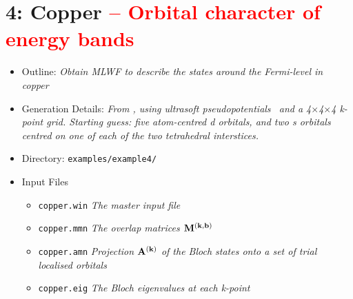 \documentclass[a4paper,11pt,twoside]{article}
\def\tent#1{\textcolor{red}{#1}}     %
\begin{document}
\cleardoublepage


\section*{4: Copper \tent{-- Orbital character of energy bands}}

\begin{itemize}
\item{Outline: \it{Obtain MLWF to describe the states around the
    Fermi-level in copper}} 
\item{Generation Details: \it{From \pwscf, using ultrasoft
    pseudopotentials~\cite{USPP} and a
    4$\times$4$\times$4 k-point grid. Starting guess: five 
    atom-centred d orbitals, and two s orbitals centred on one of each
    of the two tetrahedral interstices.}}
\item{Directory: {\tt examples/example4/}}
\item{Input Files}
\begin{itemize}
\item{ {\tt copper.win}  {\it The master input file}}
\item{ {\tt copper.mmn}  {\it The overlap matrices $\mathbf{M}^{(\mathbf{k},\mathbf{b})}$}}
\item{ {\tt copper.amn}  {\it Projection $\mathbf{A}^{(\mathbf{k})}$ of the Bloch states onto a
    set of trial localised orbitals}} 
\item{ {\tt copper.eig}  {\it The Bloch eigenvalues at each k-point}}
\end{itemize}

\end{itemize}
\end{document}
